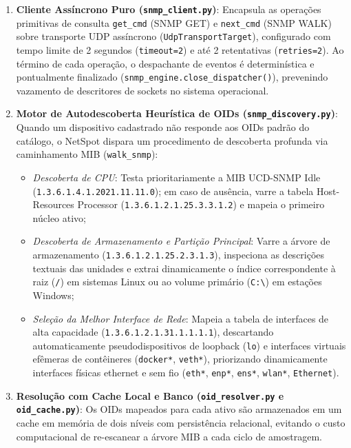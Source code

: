 \documentclass[12pt,a4paper]{article}
\begin{document}
\begin{enumerate}[leftmargin=1.25cm]
\item \textbf{Cliente Assíncrono Puro (\texttt{snmp\_client.py})}: Encapsula as operações primitivas de consulta \texttt{get\_cmd} (SNMP GET) e \texttt{next\_cmd} (SNMP WALK) sobre transporte UDP assíncrono (\texttt{UdpTransportTarget}), configurado com tempo limite de 2 segundos (\texttt{timeout=2}) e até 2 retentativas (\texttt{retries=2}). Ao término de cada operação, o despachante de eventos é determinística e pontualmente finalizado (\texttt{snmp\_engine.close\_dispatcher()}), prevenindo vazamento de descritores de sockets no sistema operacional.
\item \textbf{Motor de Autodescoberta Heurística de OIDs (\texttt{snmp\_discovery.py})}: Quando um dispositivo cadastrado não responde aos OIDs padrão do catálogo, o NetSpot dispara um procedimento de descoberta profunda via caminhamento MIB (\texttt{walk\_snmp}):
  \begin{itemize}
  \item \textit{Descoberta de CPU}: Testa prioritariamente a MIB UCD-SNMP Idle (\texttt{1.3.6.1.4.1.2021.11.11.0}); em caso de ausência, varre a tabela Host-Resources Processor (\texttt{1.3.6.1.2.1.25.3.3.1.2}) e mapeia o primeiro núcleo ativo;
  \item \textit{Descoberta de Armazenamento e Partição Principal}: Varre a árvore de armazenamento (\texttt{1.3.6.1.2.1.25.2.3.1.3}), inspeciona as descrições textuais das unidades e extrai dinamicamente o índice correspondente à raiz (\texttt{/}) em sistemas Linux ou ao volume primário (\texttt{C:\textbackslash}) em estações Windows;
  \item \textit{Seleção da Melhor Interface de Rede}: Mapeia a tabela de interfaces de alta capacidade (\texttt{1.3.6.1.2.1.31.1.1.1.1}), descartando automaticamente pseudodispositivos de loopback (\texttt{lo}) e interfaces virtuais efêmeras de contêineres (\texttt{docker*}, \texttt{veth*}), priorizando dinamicamente interfaces físicas ethernet e sem fio (\texttt{eth*}, \texttt{enp*}, \texttt{ens*}, \texttt{wlan*}, \texttt{Ethernet}).
  \end{itemize}
\item \textbf{Resolução com Cache Local e Banco (\texttt{oid\_resolver.py} e \texttt{oid\_cache.py})}: Os OIDs mapeados para cada ativo são armazenados em um cache em memória de dois níveis com persistência relacional, evitando o custo computacional de re-escanear a árvore MIB a cada ciclo de amostragem.
\end{enumerate}
\end{document}
